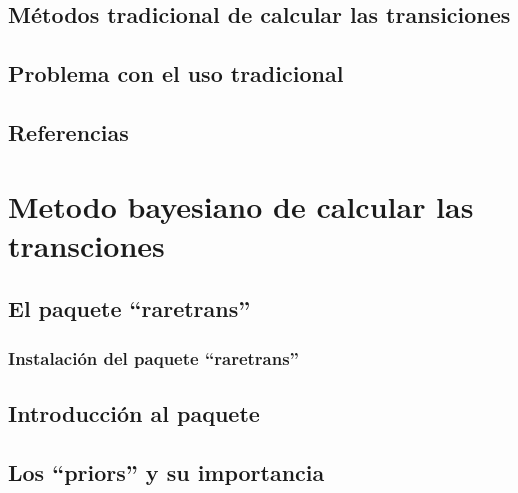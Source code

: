 \documentclass[
]{book}
\theoremstyle{definition}
\theoremstyle{definition}
\theoremstyle{definition}
\theoremstyle{definition}
\theoremstyle{remark}
\begin{document}
\hypertarget{muxe9todos-tradicional-de-calcular-las-transiciones}{%
\section{Métodos tradicional de calcular las transiciones}\label{muxe9todos-tradicional-de-calcular-las-transiciones}}

\hypertarget{problema-con-el-uso-tradicional}{%
\section{Problema con el uso tradicional}\label{problema-con-el-uso-tradicional}}

\hypertarget{referencias-3}{%
\section{Referencias}\label{referencias-3}}

\hypertarget{metodo-bayesiano-de-calcular-las-transciones}{%
\chapter{Metodo bayesiano de calcular las transciones}\label{metodo-bayesiano-de-calcular-las-transciones}}

\hypertarget{el-paquete-raretrans}{%
\section{El paquete ``raretrans''}\label{el-paquete-raretrans}}

\hypertarget{instalaciuxf3n-del-paquete-raretrans}{%
\subsection{Instalación del paquete ``raretrans''}\label{instalaciuxf3n-del-paquete-raretrans}}

\hypertarget{introducciuxf3n-al-paquete}{%
\section{Introducción al paquete}\label{introducciuxf3n-al-paquete}}

\hypertarget{los-priors-y-su-importancia}{%
\section{Los ``priors'' y su importancia}\label{los-priors-y-su-importancia}}
\end{document}
